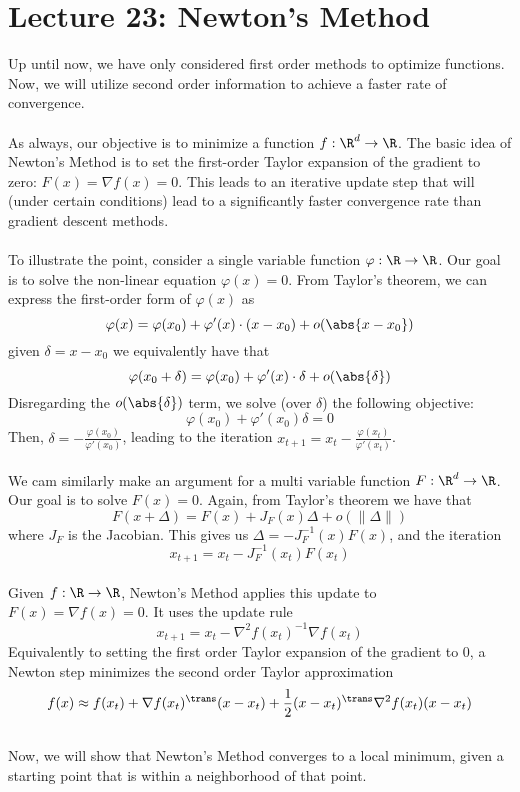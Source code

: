\section{Lecture 23: Newton's Method}
Up until now, we have only considered first order  methods to optimize functions. Now, we will utilize second order information to achieve a faster rate of convergence.
\\
\\
As always, our objective is to minimize a function $f : \R^d \rightarrow \R$. The basic idea of Newton's Method is to set the first-order Taylor expansion of the gradient to zero: $F(x) = \nabla f(x) = 0$. This leads to an iterative update step that will (under certain conditions) lead to a significantly faster convergence rate than gradient descent methods.
\\
\\
To illustrate the point, consider a single variable function $\varphi:\R \rightarrow \R$. Our goal is to solve the non-linear equation $\varphi(x) = 0$. From Taylor's theorem, we can express the first-order form of $\varphi(x)$ as
$$\varphi(x) = \varphi(x_0) + \varphi'(x) \cdot (x-x_0) + o(\abs{x-x_0})$$
given $\delta = x - x_0$ we equivalently have that
$$\varphi(x_0 + \delta) = \varphi(x_0) + \varphi'(x) \cdot \delta + o(\abs{\delta})$$
Disregarding the $o(\abs{\delta})$ term, we solve (over $\delta$) the following objective: $$\varphi(x_0) + \varphi'(x_0) \delta = 0$$
Then, $\delta = -\frac{\varphi(x_0)}{\varphi'(x_0)}$, leading to the iteration 
$x_{t+1} = x_t - \frac{\varphi(x_t)}{\varphi'(x_t)}$.
\\
\\
We cam similarly make an argument for a multi variable function $F: \R^d \rightarrow \R$. Our goal is to solve $F(x) = 0$. Again, from Taylor's theorem we have that
$$F(x + \Delta) = F(x) +  J_F(x) \Delta + o(\| \Delta\|)$$
where $J_F$ is the Jacobian. This gives us
$\Delta = -J_F^{-1}(x)F(x)$, and the iteration
$$x_{t+1} = x_t - J_F^{-1}(x_t)F(x_t)$$
\\
Given $f : \R \rightarrow \R$, Newton's Method applies this update to $F(x) = \nabla f(x) = 0$. It uses the update rule
$$x_{t+1} = x_t - \nabla^2 f(x_t)^{-1} \nabla f(x_t)$$
Equivalently to setting the first order Taylor expansion of the gradient to 0, a Newton step minimizes the second order Taylor approximation
$$f(x) \approx f(x_t) + \nabla f(x_t) ^\trans (x - x_t) + \frac{1}{2} (x - x_t) ^\trans \nabla^2 f(x_t) (x - x_t)$$
\\
Now, we will show that Newton's Method converges to a local minimum, given a starting point that is within a neighborhood of that point.

